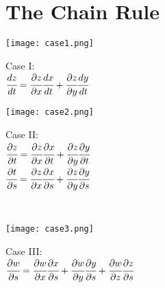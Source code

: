 \section{The Chain Rule}
\noindent\begin{minipage}{0.5\textwidth}
\begin{center}
   \texttt{[image: case1.png]}\\
\end{center}
\end{minipage}
\noindent\begin{minipage}{0.5\textwidth}
Case I:\\
$\cfrac{dz}{dt}=\cfrac{\partial  z}{\partial  x}\cfrac{dx}{dt}+\cfrac{\partial  z}{\partial  y}\cfrac{dy}{dt}$\\
\end{minipage}
\noindent\begin{minipage}{0.5\textwidth}
\begin{center}
   \texttt{[image: case2.png]}\\
\end{center}\end{minipage}
\noindent\begin{minipage}{0.3\textwidth}
Case II:\\
$\cfrac{\partial  z}{\partial  t}=\cfrac{\partial  z}{\partial  x}\cfrac{\partial  x}{\partial  t}+\cfrac{\partial  z}{\partial  y}\cfrac{\partial  y}{\partial  t}$\\
$\cfrac{\partial  t}{\partial s}=\cfrac{\partial z}{\partial x}\cfrac{\partial x}{\partial s}+\cfrac{\partial z}{\partial y}\cfrac{\partial y}{\partial s}$\\
\end{minipage}
\\
\noindent\begin{minipage}{0.5\textwidth}
\begin{center}
   \texttt{[image: case3.png]}\\
\end{center}\end{minipage}
\noindent\begin{minipage}{0.3\textwidth}
Case III:\\
$\cfrac{\partial w}{\partial s}=\cfrac{\partial w}{\partial x}\cfrac{\partial x}{\partial s}+\cfrac{\partial w}{\partial y}\cfrac{\partial y}{\partial s}+\cfrac{\partial w}{\partial z}\cfrac{\partial z}{\partial s}$\\
\end{minipage}\\
